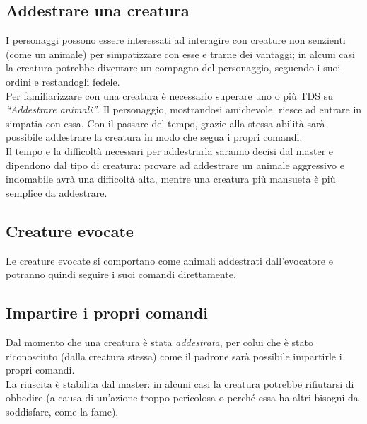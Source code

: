 \documentclass[../manuale_main.tex]{subfiles}
\begin{document}
\subsection{Addestrare una creatura}
I personaggi possono essere interessati ad interagire con creature non senzienti (come un animale) per simpatizzare con esse e trarne dei vantaggi; in alcuni casi la creatura potrebbe diventare un compagno del personaggio, seguendo i suoi ordini e restandogli fedele.\\
Per familiarizzare con una creatura è necessario superare uno o più TDS su \emph{``Addestrare animali''}. Il personaggio, mostrandosi amichevole, riesce ad entrare in simpatia con essa. 
Con il passare del tempo, grazie alla stessa abilità sarà possibile addestrare la creatura in modo che segua i propri comandi.\\
Il tempo e la difficoltà necessari per addestrarla saranno decisi dal master e dipendono dal tipo di creatura: provare ad addestrare un animale aggressivo e indomabile avrà una difficoltà alta, mentre una creatura più mansueta è più semplice da addestrare. 

\subsection{Creature evocate}
Le creature evocate si comportano come animali addestrati dall'evocatore e potranno quindi seguire i suoi comandi direttamente.

\subsection{Impartire i propri comandi}

Dal momento che una creatura è stata \emph{addestrata}, per colui che è stato riconosciuto (dalla creatura stessa) come il padrone sarà possibile impartirle i propri comandi.\\
La riuscita è stabilita dal master: in alcuni casi la creatura potrebbe rifiutarsi di obbedire (a causa di un'azione troppo pericolosa o perché essa ha altri bisogni da soddisfare, come la fame).
\end{document}
